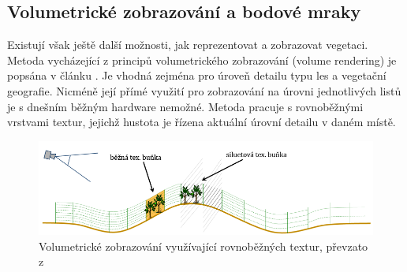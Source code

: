 \subsection{Volumetrické zobrazování a bodové mraky}
Existují však ještě další možnosti, jak reprezentovat a zobrazovat vegetaci. Metoda vycházející z principů volumetrického zobrazování (volume rendering) je popsána v článku \cite{DN04}. Je vhodná zejména pro úroveň detailu typu les a vegetační geografie. Nicméně její přímé využití pro zobrazování na úrovni jednotlivých listů je s dnešním běžným hardware nemožné. Metoda pracuje s rovnoběžnými vrstvami textur, jejichž hustota je řízena aktuální úrovní detailu v daném místě.
\begin{figure}[here]
\begin{center}
\includegraphics[width=1.0\textwidth]{./figures/a1_slicing.png}
\end{center}
\caption[Volumetrické zobrazování využívající rovnoběžných textur]%
{Volumetrické zobrazování využívající rovnoběžných textur, převzato z \cite{DN04}
}
\label{fig:VOLUME_texcells}
\end{figure}

